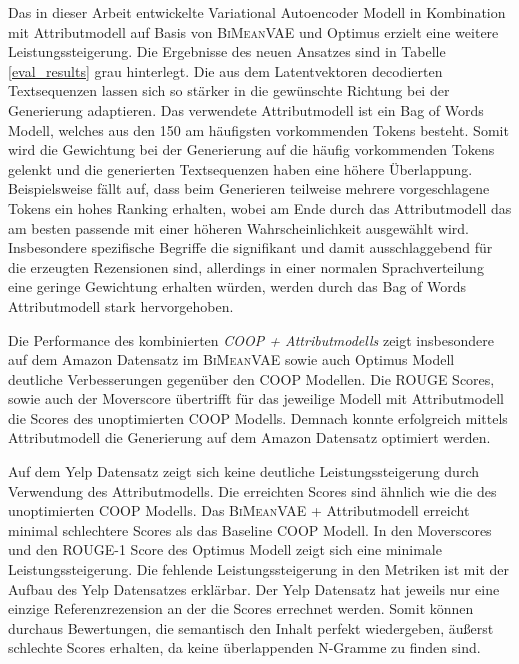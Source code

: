 Das in dieser Arbeit entwickelte Variational Autoencoder Modell in Kombination mit Attributmodell auf Basis von \textsc{BiMeanVAE} und Optimus erzielt eine weitere Leistungssteigerung.
Die Ergebnisse des neuen Ansatzes sind in Tabelle \ref{eval_results} grau hinterlegt.
Die aus dem Latentvektoren decodierten Textsequenzen lassen sich so stärker in die gewünschte Richtung bei der Generierung adaptieren. 
Das verwendete Attributmodell ist ein Bag of Words Modell, welches aus den 150 am häufigsten vorkommenden Tokens besteht. 
Somit wird die Gewichtung bei der Generierung auf die häufig vorkommenden Tokens gelenkt und die generierten Textsequenzen haben eine höhere Überlappung.
Beispielsweise fällt auf, dass beim Generieren teilweise mehrere vorgeschlagene Tokens ein hohes Ranking erhalten, wobei am Ende durch das Attributmodell das am besten passende mit einer höheren Wahrscheinlichkeit ausgewählt wird.
Insbesondere spezifische Begriffe die signifikant und damit ausschlaggebend für die erzeugten Rezensionen sind, allerdings in einer normalen Sprachverteilung eine geringe Gewichtung erhalten würden, werden durch das Bag of Words Attributmodell stark hervorgehoben.

Die Performance des kombinierten \textit{COOP + Attributmodells} zeigt insbesondere auf dem Amazon Datensatz im \textsc{BiMeanVAE} sowie auch Optimus Modell deutliche Verbesserungen gegenüber den COOP Modellen.
Die ROUGE Scores, sowie auch der Moverscore übertrifft für das jeweilige Modell mit Attributmodell die Scores des unoptimierten COOP Modells. 
Demnach konnte erfolgreich mittels Attributmodell die Generierung auf dem Amazon Datensatz optimiert werden.

Auf dem Yelp Datensatz zeigt sich keine deutliche Leistungssteigerung durch Verwendung des Attributmodells. 
Die erreichten Scores sind ähnlich wie die des unoptimierten COOP Modells. 
Das \textsc{BiMeanVAE} + Attributmodell erreicht minimal schlechtere Scores als das Baseline COOP Modell.
In den Moverscores und den ROUGE-1 Score des Optimus Modell zeigt sich eine minimale Leistungssteigerung.
Die fehlende Leistungssteigerung in den Metriken ist mit der Aufbau des Yelp Datensatzes erklärbar. 
Der Yelp Datensatz hat jeweils nur eine einzige Referenzrezension an der die Scores errechnet werden.
Somit können durchaus Bewertungen, die semantisch den Inhalt perfekt wiedergeben, äußerst schlechte Scores erhalten, da keine überlappenden N-Gramme zu finden sind.

